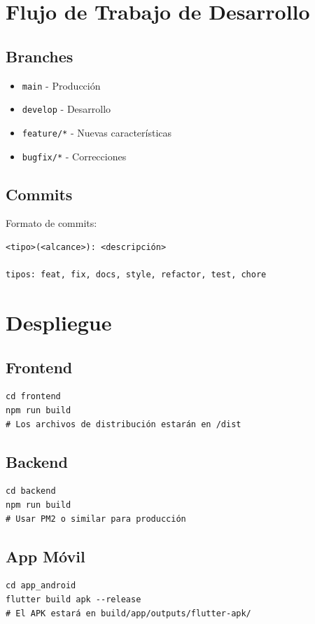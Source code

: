 \documentclass[12pt,a4paper]{article}
\begin{document}
\section{Flujo de Trabajo de Desarrollo}

\subsection{Branches}
\begin{itemize}
    \item \texttt{main} - Producción
    \item \texttt{develop} - Desarrollo
    \item \texttt{feature/*} - Nuevas características
    \item \texttt{bugfix/*} - Correcciones
\end{itemize}

\subsection{Commits}
Formato de commits:
\begin{verbatim}
<tipo>(<alcance>): <descripción>

tipos: feat, fix, docs, style, refactor, test, chore
\end{verbatim}

\section{Despliegue}

\subsection{Frontend}
\begin{verbatim}
cd frontend
npm run build
# Los archivos de distribución estarán en /dist
\end{verbatim}

\subsection{Backend}
\begin{verbatim}
cd backend
npm run build
# Usar PM2 o similar para producción
\end{verbatim}

\subsection{App Móvil}
\begin{verbatim}
cd app_android
flutter build apk --release
# El APK estará en build/app/outputs/flutter-apk/
\end{verbatim}
\end{document}
